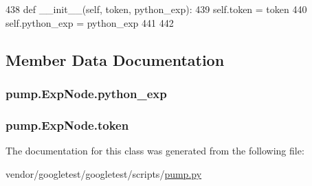 \begin{DoxyCode}
438   \textcolor{keyword}{def }\_\_init\_\_(self, token, python\_exp):
439     self.token = token
440     self.python\_exp = python\_exp
441 
442 
\end{DoxyCode}


\subsection{Member Data Documentation}
\subsubsection[{\texorpdfstring{python\+\_\+exp}{python_exp}}]{\setlength{\rightskip}{0pt plus 5cm}pump.\+Exp\+Node.\+python\+\_\+exp}\hypertarget{classpump_1_1ExpNode_adccfe4778c2e34f6b2c88118c0f1587f}{}\label{classpump_1_1ExpNode_adccfe4778c2e34f6b2c88118c0f1587f}
\subsubsection[{\texorpdfstring{token}{token}}]{\setlength{\rightskip}{0pt plus 5cm}pump.\+Exp\+Node.\+token}\hypertarget{classpump_1_1ExpNode_ade05a5a32535d717dc5c194569aaf356}{}\label{classpump_1_1ExpNode_ade05a5a32535d717dc5c194569aaf356}


The documentation for this class was generated from the following file\+:\begin{DoxyCompactItemize}
\item 
vendor/googletest/googletest/scripts/\hyperlink{pump_8py}{pump.\+py}\end{DoxyCompactItemize}
